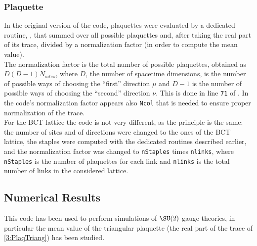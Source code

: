 \subsubsection{Plaquette}
In the original version of the code, plaquettes were evaluated by a dedicated routine, , that summed over all possible plaquettes and, after taking the real part of its trace, divided by a normalization factor (in order to compute the mean value).\\
The normalization factor is the total number of possible plaquettes, obtained as $D(D-1)N_{sites}$, where $D$, the number of spacetime dimensions, is the number of possible ways of choosing the ``first'' direction $\mu$ and $D-1$ is the number of possible ways of choosing the ``second'' direction $\nu$.
This is done in line \texttt{71} of .
In the code's normalization factor appears also \texttt{Ncol} that is needed to ensure proper normalization of the trace.\\
For the BCT lattice the code is not very different, as the principle is the same: the number of sites and of directions were changed to the ones of the BCT lattice, the staples were computed with the dedicated routines described earlier, and the normalization factor was changed to \texttt{nStaples} times \texttt{nlinks}, where \texttt{nStaples} is the number of plaquettes for each link and \texttt{nlinks} is the total number of links in the considered lattice.

\subsection{Numerical Results}
This code has been used to perform simulations of $\SU(2)$ gauge theories, in particular the mean value of the triangular plaquette (the real part of the trace of \eqref{3:PlaqTriang}) has been studied.

